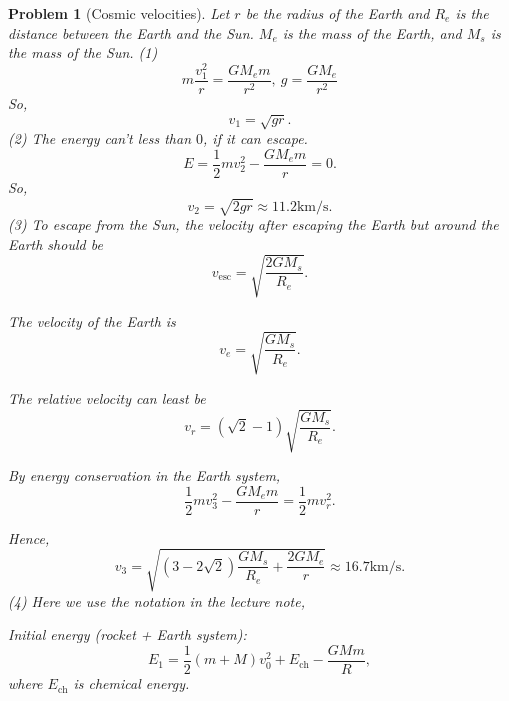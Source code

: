 \documentclass{article}
\theoremstyle{1}
\newtheorem{problem}{Problem}
\begin{document}
\begin{problem}[Cosmic velocities]
    Let $r$ be the radius of the Earth and $R_e$ is the distance between the Earth and the Sun. $M_e$ is the mass of the Earth, and $M_s$ is the mass of the Sun. 
    \newline
    (1) 
    \begin{equation}
        m\frac{v_1^2}{r}=\frac{GM_e m }{r^2},\ g=\frac{GM_e}{r^2}
    \end{equation}
    So,
    \begin{equation}
        v_1=\sqrt{gr}.
    \end{equation}
    (2) The energy can't less than $0$, if it can escape.
    \begin{equation}
        E=\frac{1}{2}mv_2^2-\frac{GM_em}{r}=0.
    \end{equation}
    So, 
    \begin{equation}
        v_2=\sqrt{2gr}\approx 11.2\mathrm{km/s}.
    \end{equation}
    (3) To escape from the Sun, the velocity after escaping the Earth but around the Earth should be 
    \begin{equation}
        v_{\mathrm{esc}}=\sqrt{\frac{2GM_s}{R_e}}.
    \end{equation}
    
    The velocity of the Earth is 
    \begin{equation}
        v_e=\sqrt{\frac{GM_s}{R_e}}.
    \end{equation}
    
    The relative velocity can least be 
    \begin{equation}
        v_r=(\sqrt{2}-1)\sqrt{\frac{GM_s}{R_e}}.
    \end{equation}
    
    By energy conservation in the Earth system,
    \begin{equation}
        \frac{1}{2}mv_3^2-\frac{GM_em}{r}=\frac{1}{2}m v_r^2.
    \end{equation}
    
    Hence,
    \begin{equation}
        v_3=\sqrt{(3-2\sqrt{2})\frac{GM_s}{R_e}+\frac{2GM_e}{r}}\approx16.7\mathrm{km/s}.
    \end{equation}
    (4) Here we use the notation in the lecture note,

    Initial energy (rocket + Earth system):
\[
E_1 = \frac{1}{2}(m + M)v_0^2 + E_{\text{ch}} - \frac{GMm}{R},
\]
where \( E_{\text{ch}} \) is chemical energy.



\end{problem}
\end{document}
